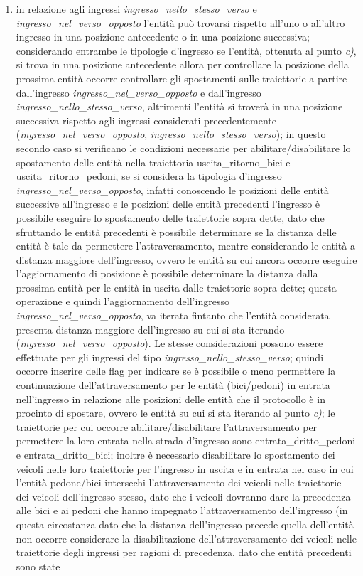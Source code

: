 \begin{enumerate}
\begin{enumerate}
\item in relazione agli ingressi \textit{ingres\-so\_nel\-lo\_stes\-so\_ver\-so} e \textit{ingres\-so\_nel\_ver\-so\_op\-pos\-to} l'entità può trovarsi rispetto all'uno o all'altro ingresso in una posizione antecedente o in una posizione successiva; considerando entrambe le tipologie d'ingresso se l'entità, ottenuta al punto \textit{c)}, si trova in una posizione antecedente allora per controllare la posizione della prossima entità occorre controllare gli spostamenti sulle traiettorie a partire dall'ingresso \textit{ingres\-so\_nel\_ver\-so\_op\-pos\-to} e dall'ingresso \textit{ingres\-so\_nel\-lo\_stes\-so\_ver\-so}, altrimenti l'entità si troverà in una posizione successiva rispetto agli ingressi considerati precedentemente (\textit{ingres\-so\_nel\_ver\-so\_op\-pos\-to}, \textit{ingres\-so\_nel\-lo\_stes\-so\_ver\-so}); in questo secondo caso si verificano le condizioni necessarie per abilitare/disabilitare lo spostamento delle entità nella traiettoria usci\-ta\_ri\-tor\-no\_bi\-ci e usci\-ta\_ri\-tor\-no\_pe\-do\-ni, se si considera la tipologia d'ingresso \textit{ingres\-so\_nel\_ver\-so\_op\-pos\-to}, infatti conoscendo le posizioni delle entità successive all'ingresso e le posizioni delle entità precedenti l'ingresso è possibile eseguire lo spostamento delle traiettorie sopra dette, dato che sfruttando le entità precedenti è possibile determinare se la distanza delle entità è tale da permettere l'attraversamento, mentre considerando le entità a distanza maggiore dell'ingresso, ovvero le entità su cui ancora occorre eseguire l'aggiornamento di posizione è possibile determinare la distanza dalla prossima entità per le entità in uscita dalle traiettorie sopra dette; questa operazione e quindi l'aggiornamento dell'ingresso \textit{ingres\-so\_nel\_ver\-so\_op\-pos\-to}, va iterata fintanto che l'entità considerata presenta distanza maggiore dell'ingresso su cui si sta iterando (\textit{ingres\-so\_nel\_ver\-so\_op\-pos\-to}). Le stesse considerazioni possono essere effettuate per gli ingressi del tipo \textit{ingres\-so\_nel\-lo\_stes\-so\_ver\-so}; quindi occorre inserire delle flag per indicare se è possibile o meno permettere la continuazione dell'attraversamento per le entità (bici/pedoni) in entrata nell'ingresso in relazione alle posizioni delle entità che il protocollo è in procinto di spostare, ovvero le entità su cui si sta iterando al punto \textit{c)}; le traiettorie per cui occorre abilitare/disabilitare l'attraversamento per permettere la loro entrata nella strada d'ingresso sono en\-tra\-ta\_drit\-to\_pe\-do\-ni e entrata\_drit\-to\_bi\-ci; inoltre è necessario disabilitare lo spostamento dei veicoli nelle loro traiettorie per l'ingresso in uscita e in entrata nel caso in cui l'entità pedone/bici intersechi l'attraversamento dei veicoli nelle traiettorie dei veicoli dell'ingresso stesso, dato che i veicoli dovranno dare la precedenza alle bici e ai pedoni che hanno impegnato l'attraversamento dell'ingresso (in questa circostanza dato che la distanza dell'ingresso precede quella dell'entità non occorre considerare la disabilitazione dell'attraversamento dei veicoli nelle traiettorie degli ingressi per ragioni di precedenza, dato che entità precedenti sono state 
\end{enumerate}
\end{enumerate}
